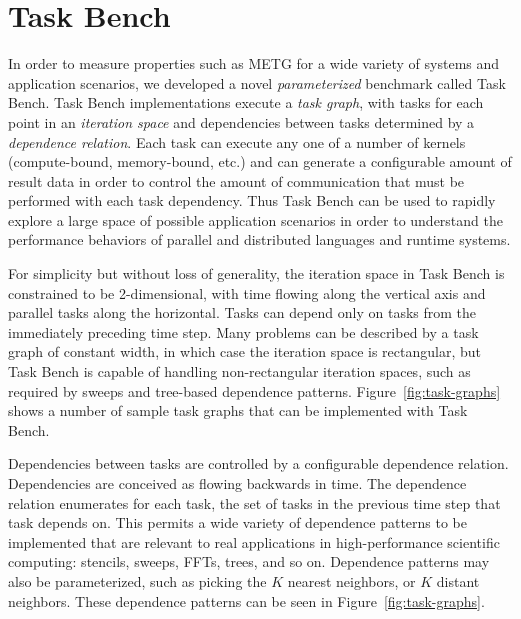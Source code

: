 \section{Task Bench}
\label{sec:task-bench}

In order to measure properties such as METG for a wide variety of
systems and application scenarios, we developed a novel
\emph{parameterized} benchmark called Task Bench. Task Bench
implementations execute a \emph{task graph}, with tasks for each point
in an \emph{iteration space} and dependencies between tasks determined
by a \emph{dependence relation}. Each task can execute any one of a
number of kernels (compute-bound, memory-bound, etc.) and can generate
a configurable amount of result data in order to control the amount of
communication that must be performed with each task dependency. Thus Task Bench can be used to
rapidly explore a large space of possible application scenarios in
order to understand the performance behaviors of parallel and
distributed languages and runtime systems.

For simplicity but without loss of generality, the iteration space in
Task Bench is constrained to be 2-dimensional, with time flowing along
the vertical axis and parallel tasks along the
horizontal. Tasks can depend only on tasks from the immediately
preceding time step. Many problems can be described by a task graph of
constant width, in which case the iteration space is rectangular, but
Task Bench is capable of handling non-rectangular iteration spaces,
such as required by sweeps and tree-based dependence
patterns. Figure~\ref{fig:task-graphs} shows a number of sample task
graphs that can be implemented with Task Bench.


Dependencies between tasks are controlled by a configurable dependence
relation. Dependencies are conceived as flowing backwards in time. The
dependence relation enumerates for each task, the set of tasks in the
previous time step that task depends on. This permits a wide variety
of dependence patterns to be implemented that are relevant to real
applications in high-performance scientific computing: stencils,
sweeps, FFTs, trees, and so on. Dependence patterns may also be
parameterized, such as picking the $K$ nearest neighbors, or $K$
distant neighbors. These dependence patterns can be seen in
Figure~\ref{fig:task-graphs}.

